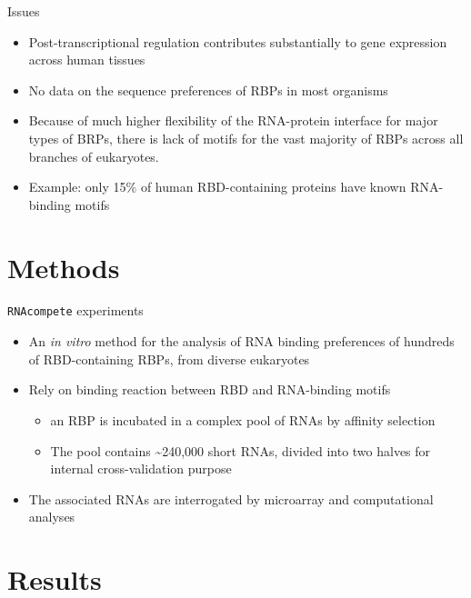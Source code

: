 \documentclass[professionalfont, 12pt, default]{beamer}
\providecommand{\tightlist}{%
    \setlength{\itemsep}{0pt}\setlength{\parskip}{0pt}}
\begin{document}
\begin{frame}{Issues}

\begin{itemize}
\tightlist
\item
  Post-transcriptional regulation contributes substantially to gene
  expression across human tissues
\item
  No data on the sequence preferences of RBPs in most organisms
\item
  Because of much higher flexibility of the RNA-protein interface for
  major types of BRPs, there is lack of motifs for the vast majority of
  RBPs across all branches of eukaryotes.
\item
  Example: only 15\% of human RBD-containing proteins have known
  RNA-binding motifs
\end{itemize}

\end{frame}

\section{Methods}\label{methods}

\begin{frame}{\texttt{RNAcompete} experiments}

\begin{itemize}
\tightlist
\item
  An \emph{in vitro} method for the analysis of RNA binding preferences
  of hundreds of RBD-containing RBPs, from diverse eukaryotes
\item
  Rely on binding reaction between RBD and RNA-binding motifs

  \begin{itemize}
  \tightlist
  \item
    an RBP is incubated in a complex pool of RNAs by affinity selection
  \item
    The pool contains \textasciitilde{}240,000 short RNAs, divided into
    two halves for internal cross-validation purpose
  \end{itemize}
\item
  The associated RNAs are interrogated by microarray and computational
  analyses
\end{itemize}

\end{frame}

\section{Results}\label{results}
\end{document}
